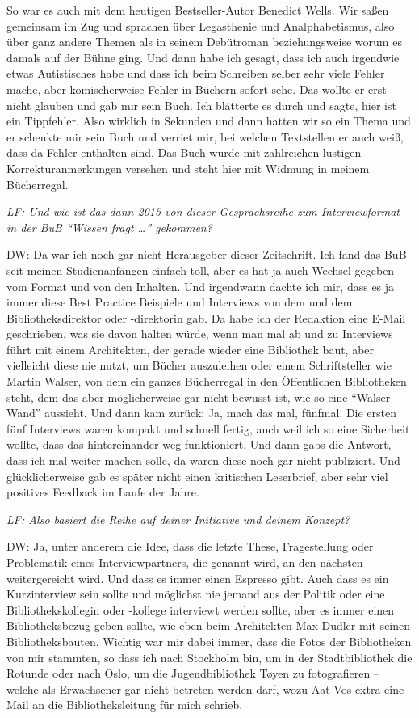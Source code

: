 \documentclass[a4paper,
fontsize=11pt,
oneside,
numbers=noperiodatend,
parskip=half-,
bibliography=totoc,
final
]{scrartcl}
\begin{document}
So war es auch mit dem heutigen Bestseller-Autor Benedict Wells. Wir
saßen gemeinsam im Zug und sprachen über Legasthenie und
Analphabetismus, also über ganz andere Themen als in seinem Debütroman
beziehungsweise worum es damals auf der Bühne ging. Und dann habe ich
gesagt, dass ich auch irgendwie etwas Autistisches habe und dass ich
beim Schreiben selber sehr viele Fehler mache, aber komischerweise
Fehler in Büchern sofort sehe. Das wollte er erst nicht glauben und gab
mir sein Buch. Ich blätterte es durch und sagte, hier ist ein
Tippfehler. Also wirklich in Sekunden und dann hatten wir so ein Thema
und er schenkte mir sein Buch und verriet mir, bei welchen Textstellen
er auch weiß, dass da Fehler enthalten sind. Das Buch wurde mit
zahlreichen lustigen Korrekturanmerkungen versehen und steht hier mit
Widmung in meinem Bücherregal.

\emph{LF: Und wie ist das dann 2015 von dieser Gesprächsreihe zum
Interviewformat in der BuB \enquote{Wissen fragt \ldots{}} gekommen?}

DW: Da war ich noch gar nicht Herausgeber dieser Zeitschrift. Ich fand
das BuB seit meinen Studienanfängen einfach toll, aber es hat ja auch
Wechsel gegeben vom Format und von den Inhalten. Und irgendwann dachte
ich mir, dass es ja immer diese Best Practice Beispiele und Interviews
von dem und dem Bibliotheksdirektor oder -direktorin gab. Da habe ich
der Redaktion eine E-Mail geschrieben, was sie davon halten würde, wenn
man mal ab und zu Interviews führt mit einem Architekten, der gerade
wieder eine Bibliothek baut, aber vielleicht diese nie nutzt, um Bücher
auszuleihen oder einem Schriftsteller wie Martin Walser, von dem ein
ganzes Bücherregal in den Öffentlichen Bibliotheken steht, dem das aber
möglicherweise gar nicht bewusst ist, wie so eine \enquote{Walser-Wand}
aussieht. Und dann kam zurück: Ja, mach das mal, fünfmal. Die ersten
fünf Interviews waren kompakt und schnell fertig, auch weil ich so eine
Sicherheit wollte, dass das hintereinander weg funktioniert. Und dann
gabs die Antwort, dass ich mal weiter machen solle, da waren diese noch
gar nicht publiziert. Und glücklicherweise gab es später nicht einen
kritischen Leserbrief, aber sehr viel positives Feedback im Laufe der
Jahre.

\emph{LF: Also basiert die Reihe auf deiner Initiative und deinem
Konzept?}

DW: Ja, unter anderem die Idee, dass die letzte These, Fragestellung
oder Problematik eines Interviewpartners, die genannt wird, an den
nächsten weitergereicht wird. Und dass es immer einen Espresso gibt.
Auch dass es ein Kurzinterview sein sollte und möglichst nie jemand aus
der Politik oder eine Bibliothekskollegin oder -kollege interviewt
werden sollte, aber es immer einen Bibliotheksbezug geben sollte, wie
eben beim Architekten Max Dudler mit seinen Bibliotheksbauten. Wichtig
war mir dabei immer, dass die Fotos der Bibliotheken von mir stammten,
so dass ich nach Stockholm bin, um in der Stadtbibliothek die Rotunde
oder nach Oslo, um die Jugendbibliothek Tøyen zu fotografieren -- welche
als Erwachsener gar nicht betreten werden darf, wozu Aat Vos extra eine
Mail an die Bibliotheksleitung für mich schrieb.
\end{document}
